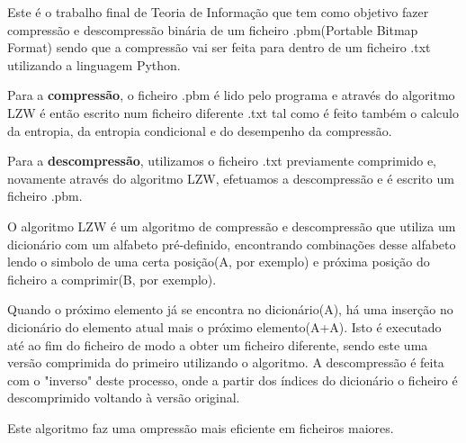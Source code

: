 \documentclass[12pt, a4paper]{article}
\begin{document}
\vspace{40px}
\begin{justify} \begin{large}
Este é o trabalho final de Teoria de Informação que tem como objetivo fazer compressão e descompressão binária de um ficheiro .pbm(Portable Bitmap Format) sendo que a compressão vai ser feita para dentro de um ficheiro .txt utilizando a linguagem Python.\vspace{7px}

Para a \textbf{compressão}, o ficheiro .pbm é lido pelo programa e através do algoritmo LZW é então escrito num ficheiro diferente .txt tal como é feito também o calculo da entropia, da entropia condicional e do desempenho da compressão.\vspace{7px}

Para a \textbf{descompressão}, utilizamos o ficheiro .txt previamente comprimido e, novamente através do algoritmo LZW, efetuamos a descompressão e é escrito um ficheiro .pbm.
\end{large} \end{justify}

\newpage
\bigskip
{}
\vspace{40px}

\begin{justify} \begin{large}
O algoritmo LZW é um algoritmo de compressão e descompressão que utiliza um dicionário com um alfabeto pré-definido, encontrando combinações desse alfabeto lendo o simbolo de uma certa posição(A, por exemplo) e próxima posição do ficheiro a comprimir(B, por exemplo).\vspace{7px}

Quando o próximo elemento já se encontra no dicionário(A), há uma inserção no dicionário do elemento atual mais o próximo elemento(A+A). Isto é executado até ao fim do ficheiro de modo a obter um ficheiro diferente, sendo este uma versão comprimida do primeiro utilizando o algoritmo. A descompressão é feita com o "inverso" deste processo, onde a partir dos índices do dicionário o ficheiro é descomprimido voltando à versão original.\vspace{7px}

Este algoritmo faz uma ompressão mais eficiente em ficheiros maiores.
\end{large} \end{justify}
\end{document}
